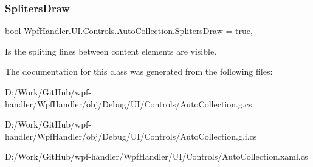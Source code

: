 \subsubsection{\texorpdfstring{Spliters\+Draw}{SplitersDraw}}
{\footnotesize\ttfamily bool Wpf\+Handler.\+U\+I.\+Controls.\+Auto\+Collection.\+Spliters\+Draw = true\hspace{0.3cm}{\ttfamily [get]}, {\ttfamily [set]}}



Is the spliting lines between content elements are visible. 



The documentation for this class was generated from the following files\+:\begin{DoxyCompactItemize}
\item 
D\+:/\+Work/\+Git\+Hub/wpf-\/handler/\+Wpf\+Handler/obj/\+Debug/\+U\+I/\+Controls/Auto\+Collection.\+g.\+cs\item 
D\+:/\+Work/\+Git\+Hub/wpf-\/handler/\+Wpf\+Handler/obj/\+Debug/\+U\+I/\+Controls/Auto\+Collection.\+g.\+i.\+cs\item 
D\+:/\+Work/\+Git\+Hub/wpf-\/handler/\+Wpf\+Handler/\+U\+I/\+Controls/Auto\+Collection.\+xaml.\+cs\end{DoxyCompactItemize}
